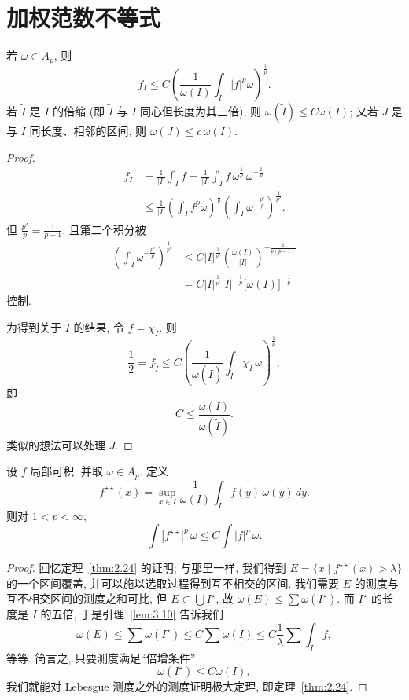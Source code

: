 \section{加权范数不等式}
\label{sec:3.3}

\begin{lemma}\label{lem:3.10}
若 $\omega\in A_p$, 则
\[
f_{I}\leq C\left(\frac{1}{\omega(I)}\int_{I}|f|^{p}\omega\right)^{\frac{1}{p}}.
\]
若 $\tilde{I}$ 是 $I$ 的倍缩 (即 $\tilde{I}$ 与 $I$ 同心但长度为其三倍), 则 $\omega(\tilde{I})\leq C\omega(I)$; 又若 $J$ 是与 $I$ 同长度、相邻的区间, 则 $\omega(J)\leq c\,\omega(I)$.
\end{lemma}

\begin{proof}
\begin{align*}
f_{I}&=\frac{1}{|I|}\int_{I}f=\frac{1}{|I|}\int_{I}f\,\omega^{\frac{1}{p}}\,\omega^{-\frac{1}{p}} \\
&\leq\frac{1}{|I|}\left(\int_{I}f^{p}\omega\right)^{\frac{1}{p}}\left(\int_{I}\omega^{-\frac{p'}{p}}\right)^{\frac{1}{p'}}.
\end{align*}
但 $\frac{p'}{p}=\frac{1}{p-1}$, 且第二个积分被
\begin{align*}
\left(\int_{I}\omega^{-\frac{p'}{p}}\right)^{\frac{1}{p'}}
&\leq C|I|^{\frac{1}{p'}}\left(\frac{\omega(I)}{|I|}\right)^{-\frac{1}{p(p-1)}} \\
&=C|I|^{\frac{1}{p'}}|I|^{-\frac{1}{p}}\bigl[\omega(I)\bigr]^{-\frac{1}{p}}
\end{align*}
控制.

为得到关于 $\tilde{I}$ 的结果, 令 $f=\chi_{I}$. 则
\[
\frac{1}{2}=f_{\tilde{I}}\leq C\left(\frac{1}{\omega(\tilde{I})}\int_{\tilde{I}}\chi_{I}\,\omega\right)^{\frac{1}{p}},
\]
即
\[
C\leq\frac{\omega(I)}{\omega(\tilde{I})}.
\]
类似的想法可以处理 $J$.
\end{proof}

\begin{lemma}\label{lem:3.11}
设 $f$ 局部可积, 并取 $\omega\in A_p$. 定义
\[
f^{\star\star}(x)=\sup_{x\in I}\frac{1}{\omega(I)}\int_{I}f(y)\,\omega(y)\,dy.
\]
则对 $1<p<\infty$,
\[
\int|f^{\star\star}|^{p}\,\omega\leq C\int|f|^{p}\,\omega.
\]
\end{lemma}

\begin{proof}
回忆定理~\ref{thm:2.24} 的证明; 与那里一样, 我们得到 $E=\{x \mid f^{\star\star}(x)>\lambda\}$ 的一个区间覆盖, 并可以施以选取过程得到互不相交的区间. 我们需要 $E$ 的测度与互不相交区间的测度之和可比, 但 $E\subset\bigcup I^{\star}$, 故 $\omega(E)\leq\sum\omega(I^{\star})$. 而 $I^{\star}$ 的长度是 $I$ 的五倍, 于是引理~\ref{lem:3.10} 告诉我们
\[
\omega(E)\leq\sum\omega(I^{\star})\leq C\sum\omega(I)\leq C\frac{1}{\lambda}\sum\int_{I}f,
\]
等等. 简言之, 只要测度满足``倍增条件''
\[
\omega(I^{\star})\leq C\omega(I),
\]
我们就能对 Lebesgue 测度之外的测度证明极大定理, 即定理~\ref{thm:2.24}.
\end{proof}

